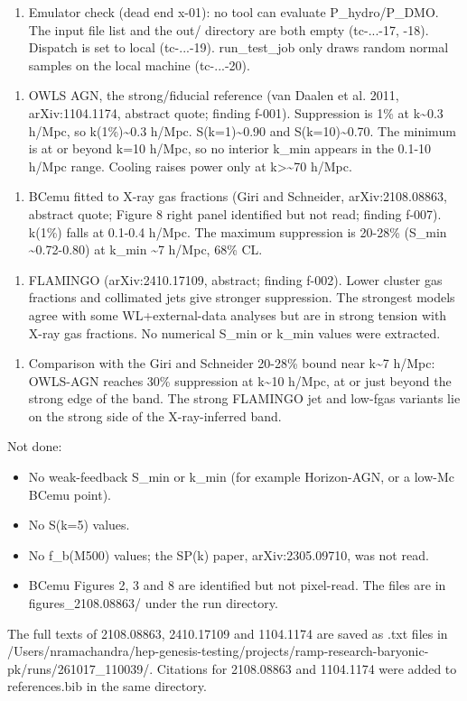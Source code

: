 \documentclass[11pt,a4paper]{article}
\begin{document}
\begin{enumerate}
  \item Emulator check (dead end x-01): no tool can evaluate P\_hydro/P\_DMO. The input file list and the out/ directory are both empty (tc-...-17, -18). Dispatch is set to local (tc-...-19). run\_test\_job only draws random normal samples on the local machine (tc-...-20).
\end{enumerate}
\begin{enumerate}
  \item OWLS AGN, the strong/fiducial reference (van Daalen et al. 2011, arXiv:1104.1174, abstract quote; finding f-001). Suppression is 1\% at k\textasciitilde{}0.3 h/Mpc, so k(1\%)\textasciitilde{}0.3 h/Mpc. S(k=1)\textasciitilde{}0.90 and S(k=10)\textasciitilde{}0.70. The minimum is at or beyond k=10 h/Mpc, so no interior k\_min appears in the 0.1-10 h/Mpc range. Cooling raises power only at k\textgreater{}\textasciitilde{}70 h/Mpc.
\end{enumerate}
\begin{enumerate}
  \item BCemu fitted to X-ray gas fractions (Giri and Schneider, arXiv:2108.08863, abstract quote; Figure 8 right panel identified but not read; finding f-007). k(1\%) falls at 0.1-0.4 h/Mpc. The maximum suppression is 20-28\% (S\_min \textasciitilde{}0.72-0.80) at k\_min \textasciitilde{}7 h/Mpc, 68\% CL.
\end{enumerate}
\begin{enumerate}
  \item FLAMINGO (arXiv:2410.17109, abstract; finding f-002). Lower cluster gas fractions and collimated jets give stronger suppression. The strongest models agree with some WL+external-data analyses but are in strong tension with X-ray gas fractions. No numerical S\_min or k\_min values were extracted.
\end{enumerate}
\begin{enumerate}
  \item Comparison with the Giri and Schneider 20-28\% bound near k\textasciitilde{}7 h/Mpc: OWLS-AGN reaches 30\% suppression at k\textasciitilde{}10 h/Mpc, at or just beyond the strong edge of the band. The strong FLAMINGO jet and low-fgas variants lie on the strong side of the X-ray-inferred band.
\end{enumerate}
Not done:

\begin{itemize}
  \item No weak-feedback S\_min or k\_min (for example Horizon-AGN, or a low-Mc BCemu point).
  \item No S(k=5) values.
  \item No f\_b(M500) values; the SP(k) paper, arXiv:2305.09710, was not read.
  \item BCemu Figures 2, 3 and 8 are identified but not pixel-read. The files are in figures\_2108.08863/ under the run directory.
\end{itemize}
The full texts of 2108.08863, 2410.17109 and 1104.1174 are saved as .txt files in /Users/nramachandra/hep-genesis-testing/projects/ramp-research-baryonic-pk/runs/261017\_110039/. Citations for 2108.08863 and 1104.1174 were added to references.bib in the same directory.
\end{document}
